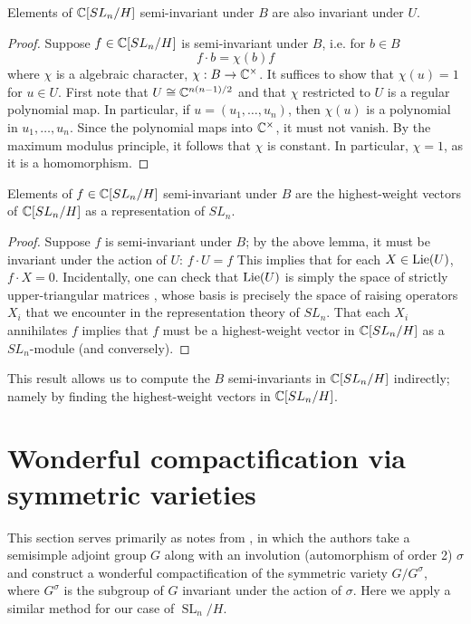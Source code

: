 \documentclass{../mathnotes}
\DeclareMathOperator{\SL}{SL}
\begin{document}
\begin{lem}
    Elements of $\mathbb{C}[SL_n/H]$ semi-invariant under $B$ are also invariant under $U$.
\end{lem}

\begin{proof}
    Suppose $f\in\mathbb{C}[SL_n/H]$ is semi-invariant under $B$, i.e. for $b\in B$
    \[f\cdot b=\chi(b) f\]
    where $\chi$ is a algebraic character, $\chi:B\to\mathbb{C}^\times$. It suffices to show that $\chi(u)=1$ for $u\in U$.
    First note that $U\cong\mathbb{C}^{n(n-1)/2}$ and that $\chi$ restricted to $U$ is a regular polynomial map. In particular,
    if $u=(u_1,\ldots, u_n)$, then $\chi(u)$ is a polynomial in $u_1,\ldots, u_n$. Since the polynomial maps into $\mathbb{C}^\times$,
    it must not vanish. By the maximum modulus principle, it follows that $\chi$ is constant. In particular, $\chi=1$, as it
    is a homomorphism.
\end{proof}

\begin{thm}
    Elements of $f\in\mathbb{C}[SL_n/H]$ semi-invariant under $B$ are the highest-weight vectors of $\mathbb{C}[SL_n/H]$ as a representation of $SL_n$.
\end{thm}

\begin{proof}
    Suppose $f$ is semi-invariant under $B$; by the above lemma, it must be invariant under the action of $U$: $f\cdot U=f$ This implies that
    for each $X\in \operatorname{Lie}(U)$, $f\cdot X=0$. Incidentally, one can check that $\operatorname{Lie}(U)$ is simply the space of strictly upper-triangular matrices
    \cite{hall2003lie}, whose basis is precisely the space of raising operators $X_i$ that we encounter in the representation theory of $SL_n$.
    That each $X_i$ annihilates $f$ implies that $f$ must be a highest-weight vector in $\mathbb{C}[SL_n/H]$ as a $SL_n$-module (and conversely).
\end{proof}

This result allows us to compute the $B$ semi-invariants in $\mathbb{C}[SL_n/H]$ indirectly; namely by finding the highest-weight vectors in $\mathbb{C}[SL_n/H]$.


\section{Wonderful compactification via symmetric varieties}

This section serves primarily as notes from \cite{de1983}, in which the authors take a semisimple adjoint group $G$ along with 
an involution (automorphism of order 2) $\sigma$ and construct a wonderful compactification of the symmetric variety $G/G^{\sigma}$,
where $G^{\sigma}$ is the subgroup of $G$ invariant under the action of $\sigma$. Here we apply a similar method for our case
of $\SL_n/H$.
\end{document}
